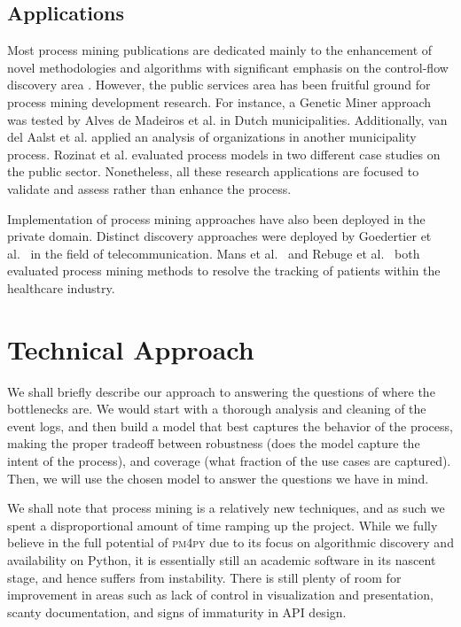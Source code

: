 \documentclass[conference]{IEEEtran}
\begin{document}
\subsection{Applications}

Most process mining publications are dedicated mainly to the enhancement
of novel methodologies and algorithms with significant emphasis on the
control-flow discovery area \cite{van2004}. However, the public services area
has been fruitful ground
for process mining development research. For instance, a
Genetic Miner approach was tested by Alves de Madeiros et al. \cite{deMe2007}
in Dutch municipalities. Additionally, van del Aalst et al. \cite{RoDJ2009}
applied an analysis of organizations in another municipality process.
Rozinat et al. \cite{RoMa2009} evaluated process models in two different case
studies on the public sector.
Nonetheless, all these research
applications are focused to validate and assess rather than enhance the
process.

Implementation of process mining approaches have also been deployed in
the private domain. Distinct discovery approaches were
deployed by Goedertier et al.~\cite{GoDW2011} in the field of
telecommunication. Mans
et al.~\cite{MaSc2008} and Rebuge et al.~\cite{ReBu2012} both
evaluated process mining methods
to resolve the tracking of patients within the healthcare industry.

\section{Technical Approach}
\label{section-technical}

We shall briefly describe our approach to answering the questions of
where the bottlenecks are. We would start with a thorough analysis and
cleaning of the event logs, and then
build a model that best captures the behavior of the
process, making the proper tradeoff
between robustness (does the model capture the intent of the process),
and coverage (what fraction of the use cases are captured).
 Then, we will use the
chosen model to answer the questions we have in mind.

We shall note that process mining is a relatively new techniques, and
as such we spent a disproportional amount of time ramping up the project.
While we fully believe in the full potential of \textsc{pm4py} due to
its focus on algorithmic discovery and availability
on Python, it is
essentially still an academic software in its nascent stage, and 
hence suffers from instability. There is still plenty of room for
improvement in areas such as lack of control in visualization and
presentation, scanty documentation, and signs of immaturity in API design.
\end{document}
